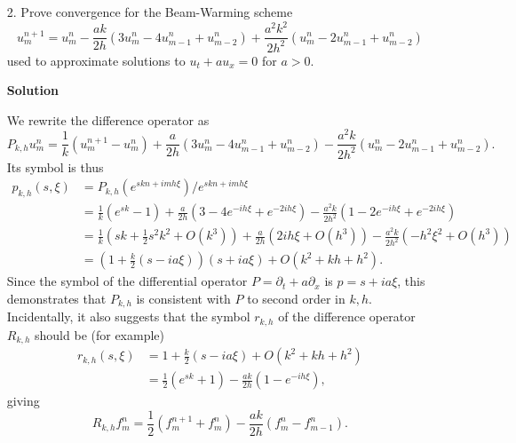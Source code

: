 \documentclass{article}
\begin{document}
\begin{itemize}
\item[2.] Prove convergence for the Beam-Warming scheme
\begin{equation*}
u^{n+1}_m = u^n_m - \frac{ak}{2h} \left( 3 u^n_m - 4 u^n_{m-1} + u^n_{m-2} \right) + \frac{a^2 k^2}{2h^2} \left( u^n_m - 2 u^n_{m-1} + u^n_{m-2} \right)
\end{equation*}
used to approximate solutions to $u_t + au_x = 0$ for $a > 0$.

\textbf{Solution}

We rewrite the difference operator as
\begin{equation*}
P_{k,h} u^n_m = \frac{1}{k} \left( u^{n+1}_m - u^n_m \right) + \frac{a}{2h} \left( 3 u^n_m - 4 u^n_{m-1} + u^n_{m-2} \right) - \frac{a^2k}{2h^2} \left( u^n_m - 2 u^n_{m-1} + u^n_{m-2} \right).
\end{equation*}
Its symbol is thus
\begin{align*}
p_{k,h}(s,\xi) & = P_{k,h} \left( e^{skn + imh\xi} \right) / e^{skn + imh\xi} \\
               & = \frac{1}{k} \left( e^{sk} - 1 \right) + \frac{a}{2h} \left( 3 - 4 e^{-ih\xi} + e^{-2ih\xi} \right) - \frac{a^2k}{2h^2} \left( 1 - 2 e^{-ih\xi} + e^{-2ih\xi} \right) \\
               & = \frac{1}{k} \left( sk + \frac{1}{2} s^2 k^2 + O \left( k^3 \right) \right) + \frac{a}{2h} \left( 2ih\xi + O \left( h^3 \right) \right) - \frac{a^2k}{2h^2} \left( -h^2 \xi^2 + O \left( h^3 \right) \right) \\
               & = \left( 1 + \frac{k}{2} \left( s - ia\xi \right) \right) \left( s + ia\xi \right) + O \left( k^2 + kh + h^2 \right).
\end{align*}
Since the symbol of the differential operator $P = \partial_t + a \partial_x$ is $p = s + ia\xi$, this demonstrates that $P_{k,h}$ is consistent with $P$ to second order in $k,h$. Incidentally, it also suggests that the symbol $r_{k,h}$ of the difference operator $R_{k,h}$ should be (for example)
\begin{align*}
r_{k,h}(s,\xi) & = 1 + \frac{k}{2} \left( s - ia\xi \right) + O \left( k^2 + kh + h^2 \right) \\
               & = \frac{1}{2} \left( e^{sk} + 1 \right) - \frac{ak}{2h} \left( 1 - e^{-ih\xi} \right),
\end{align*}
giving
\begin{equation*}
R_{k,h} f^n_m = \frac{1}{2} \left( f^{n+1}_m + f^n_m \right) - \frac{ak}{2h} \left( f^n_m - f^n_{m-1} \right).
\end{equation*}


\end{itemize}
\end{document}
